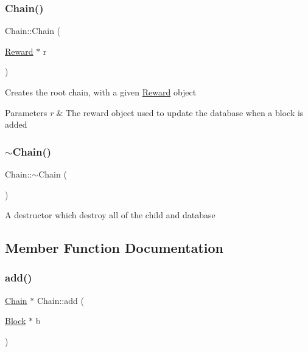 \subsubsection{\texorpdfstring{Chain()}{Chain()}\hspace{0.1cm}{\footnotesize\ttfamily [2/2]}}
{\footnotesize\ttfamily Chain\+::\+Chain (\begin{DoxyParamCaption}\item[{\mbox{\hyperlink{classReward}{Reward}} $\ast$}]{r }\end{DoxyParamCaption})}

Creates the root chain, with a given \mbox{\hyperlink{classReward}{Reward}} object


\begin{DoxyParams}{Parameters}
{\em r} & The reward object used to update the database when a block is added \\
\hline
\end{DoxyParams}
\mbox{\label{classChain_a06b56afcf5b9ef0c6371b49ae2eef2da}} 
\subsubsection{\texorpdfstring{$\sim$\+Chain()}{~Chain()}}
{\footnotesize\ttfamily Chain\+::$\sim$\+Chain (\begin{DoxyParamCaption}{ }\end{DoxyParamCaption})}

A destructor which destroy all of the child and database 

\subsection{Member Function Documentation}
\mbox{\label{classChain_a7a271a75a12aeae52a2645dcaa14549c}} 
\subsubsection{\texorpdfstring{add()}{add()}}
{\footnotesize\ttfamily \mbox{\hyperlink{classChain}{Chain}} $\ast$ Chain\+::add (\begin{DoxyParamCaption}\item[{\mbox{\hyperlink{classBlock}{Block}} $\ast$}]{b }\end{DoxyParamCaption})}

